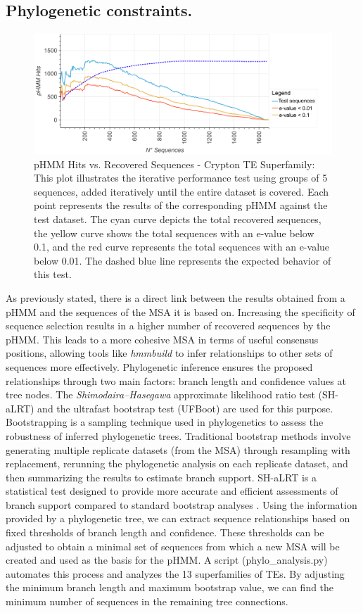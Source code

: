 \documentclass[unnumsec,webpdf,contemporary,large]{oup-authoring-template}%
\theoremstyle{thmstyleone}%
\theoremstyle{thmstyletwo}%
\theoremstyle{thmstylethree}%
\begin{document}
\subsection{Phylogenetic constraints.}\label{subsec3_3}
\begin{figure}[t]%
    \centering
    \includegraphics[width=\textwidth]{figs/best_msa_cryp.png}
    \caption{pHMM Hits vs. Recovered Sequences - Crypton TE Superfamily: This plot illustrates the iterative performance test using groups of 5 sequences, added iteratively until the entire dataset is covered. Each point represents the results of the corresponding pHMM against the test dataset. The cyan curve depicts the total recovered sequences, the yellow curve shows the total sequences with an e-value below 0.1, and the red curve represents the total sequences with an e-value below 0.01. The dashed blue line represents the expected behavior of this test.}
    \label{fig:image3}
\end{figure}
As previously stated, there is a direct link between the results obtained from a pHMM and the sequences of the MSA it is based on. Increasing the specificity of sequence selection results in a higher number of recovered sequences by the pHMM. This leads to a more cohesive MSA in terms of useful consensus positions, allowing tools like \textit{hmmbuild} to infer relationships to other sets of sequences more effectively. Phylogenetic inference ensures the proposed relationships through two main factors: branch length and confidence values at tree nodes. The \textit{Shimodaira–Hasegawa} approximate likelihood ratio test (SH-aLRT) and the ultrafast bootstrap test (UFBoot) are used for this purpose. Bootstrapping is a sampling technique used in phylogenetics to assess the robustness of inferred phylogenetic trees. Traditional bootstrap methods involve generating multiple replicate datasets (from the MSA) through resampling with replacement, rerunning the phylogenetic analysis on each replicate dataset, and then summarizing the results to estimate branch support. SH-aLRT is a statistical test designed to provide more accurate and efficient assessments of branch support compared to standard bootstrap analyses \cite{shimodaira_multiple_1999,guindon_new_2010}. Using the information provided by a phylogenetic tree, we can extract sequence relationships based on fixed thresholds of branch length and confidence. These thresholds can be adjusted to obtain a minimal set of sequences from which a new MSA will be created and used as the basis for the pHMM. A script (phylo\_analysis.py) automates this process and analyzes the 13 superfamilies of TEs. By adjusting the minimum branch length and maximum bootstrap value, we can find the minimum number of sequences in the remaining tree connections.
\end{document}
